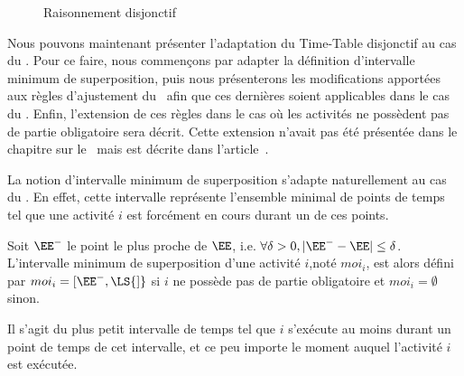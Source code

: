 \begin{ex}
\begin{figure}[htb!]
{
}
  \caption{Raisonnement disjonctif}
  \label{fig:disj_CECSP}
\end{figure}
\end{ex}

Nous pouvons maintenant présenter l'adaptation du Time-Table
disjonctif au cas du \CECSP. Pour ce faire, nous commençons par
adapter la définition d'intervalle minimum de superposition, puis nous
présenterons les modifications apportées aux règles d'ajustement du
\CUSP~afin que ces dernières soient applicables dans le cas du
\CECSP. Enfin, l'extension de ces règles dans le cas où les activités
ne possèdent pas de partie obligatoire sera décrit. Cette extension
n'avait pas été présentée dans le chapitre sur le \CUSP~mais est
décrite dans l'article~\cite{Gay2015}. 

La notion d'intervalle minimum de superposition s'adapte naturellement
au cas du \CECSP. En effet, cette intervalle représente l'ensemble
minimal de points de temps tel que une activité $i$ est forcément en
cours durant un de ces points. 

\begin{defi}
\label{des:moi_CUSP} 
Soit $\EE^{-}$ le point le plus proche de $\EE$, i.e. $\forall \delta
>0 , |\EE^{-} -\EE| \le \delta$. L'intervalle minimum de
superposition d'une activité $i$,noté $moi_i$, est alors défini par
$moi_i=[\EE^{-},\LS{]}$ si $i$ ne possède pas de partie obligatoire et
$moi_i=\emptyset$ sinon.   

Il s'agit du plus petit intervalle de temps tel que $i$ s’exécute au
moins durant un point de temps de cet intervalle, et ce peu importe le
moment auquel l'activité $i$ est exécutée.
\end{defi}



